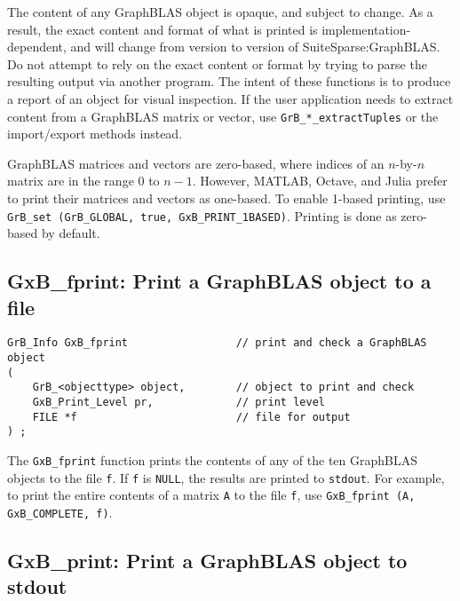 \documentclass[12pt]{article}
\begin{document}
The content of any GraphBLAS object is opaque, and subject to change.  As a
result, the exact content and format of what is printed is
implementation-dependent, and will change from version to version of
SuiteSparse:GraphBLAS.  Do not attempt to rely on the exact content or format
by trying to parse the resulting output via another program.  The intent of
these functions is to produce a report of an object for visual inspection.  If
the user application needs to extract content from a GraphBLAS matrix or
vector, use \verb'GrB_*_extractTuples' or the import/export methods instead.

GraphBLAS matrices and vectors are zero-based, where indices of an $n$-by-$n$
matrix are in the range 0 to $n-1$.  However, MATLAB, Octave, and Julia prefer
to print their matrices and vectors as one-based.  To enable 1-based printing,
use \verb'GrB_set (GrB_GLOBAL, true, GxB_PRINT_1BASED)'.  Printing is done as zero-based by
default.

\subsection{{\sf GxB\_fprint:} Print a GraphBLAS object to a file} %

\begin{mdframed}[userdefinedwidth=6in]
{\footnotesize
\begin{verbatim}
GrB_Info GxB_fprint                 // print and check a GraphBLAS object
(
    GrB_<objecttype> object,        // object to print and check
    GxB_Print_Level pr,             // print level
    FILE *f                         // file for output
) ;
\end{verbatim} } \end{mdframed}

The \verb'GxB_fprint' function prints the contents of any of the ten GraphBLAS
objects to the file \verb'f'.  If \verb'f' is \verb'NULL', the results are
printed to \verb'stdout'.  For example, to print the entire contents of a
matrix \verb'A' to the file \verb'f', use
\verb'GxB_fprint (A, GxB_COMPLETE, f)'.

\subsection{{\sf GxB\_print:} Print a GraphBLAS object to {\sf stdout}} %
\label{gxb_print}
\end{document}

